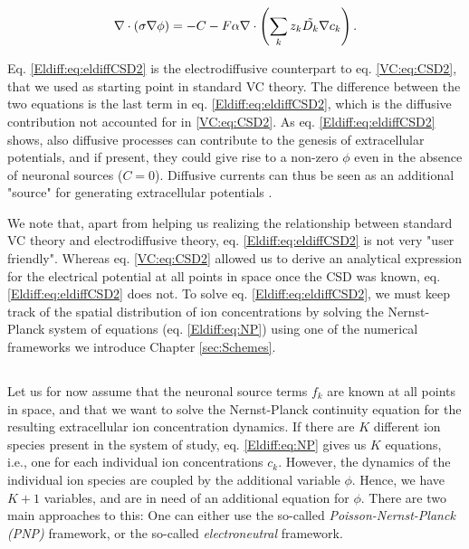 \begin{equation}
\nabla \cdot (\sigma\nabla\phi) = - C - F\alpha \nabla \cdot \left (\sum_k{z_k \tilde{D_k}{\bf \nabla} c_{k}} \right).
\label{Eldiff:eq:eldiffCSD2}
\end{equation}

Eq. \ref{Eldiff:eq:eldiffCSD2} is the electrodiffusive counterpart to eq. \ref{VC:eq:CSD2}, that we used as starting point in standard VC theory. The difference between the two equations is the last term in eq. \ref{Eldiff:eq:eldiffCSD2}, which is the diffusive contribution not accounted for in \ref{VC:eq:CSD2}. As eq. \ref{Eldiff:eq:eldiffCSD2} shows, also diffusive processes can contribute to the genesis of extracellular potentials, and if present, they could give rise to a non-zero $\phi$ even in the absence of neuronal sources ($C = 0$). Diffusive currents can thus be seen as an additional "source" for generating extracellular potentials \cite{Halnes2017}. 

We note that, apart from helping us realizing the relationship between standard VC theory and electrodiffusive theory, eq. \ref{Eldiff:eq:eldiffCSD2} is not very "user friendly". Whereas eq. \ref{VC:eq:CSD2} allowed us to derive an analytical expression for the electrical potential at all points in space once the CSD was known, eq. \ref{Eldiff:eq:eldiffCSD2} does not. To solve  eq. \ref{Eldiff:eq:eldiffCSD2}, we must keep track of the spatial distribution of ion concentrations by solving the Nernst-Planck system of equations (eq. \ref{Eldiff:eq:NP}) using one of the numerical frameworks we introduce Chapter \ref{sec:Schemes}. 


\subsection{ }
\label{sec:Eldiff:frameworks}
Let us for now assume that the neuronal source terms $f_k$ are known at all points in space, and that we want to solve the Nernst-Planck continuity equation for the resulting extracellular ion concentration dynamics. If there are $K$ different ion species present in the system of study, eq. \ref{Eldiff:eq:NP} gives us $K$ equations, i.e., one for each individual ion concentrations $c_k$. However, the dynamics of the individual ion species are coupled by the additional variable $\phi$. Hence, we have $K+1$ variables, and are in need of an additional equation for $\phi$. There are two main approaches to this: One can either use the so-called \textit{Poisson-Nernst-Planck (PNP)} framework, or the so-called \textit{electroneutral} framework.

